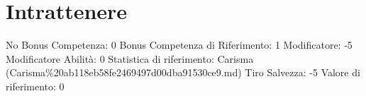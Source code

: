 \section{Intrattenere}\label{intrattenere}

\begin{description}
\tightlist
\item[Tags: ABI]
No Bonus Competenza: 0 Bonus Competenza di Riferimento: 1 Modificatore:
-5 Modificatore Abilità: 0 Statistica di riferimento: Carisma
(Carisma\%20ab118eb58fe2469497d00dba91530ce9.md) Tiro Salvezza: -5
Valore di riferimento: 0
\end{description}
